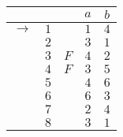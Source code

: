\begin{tabular}{clc|cc}
&&&$a$&$b$\\\hline
$\rightarrow$	&$1$&		&$1$&$4$\\
		&$2$&		&$3$&$1$\\
		&$3$&$F$	&$4$&$2$\\
		&$4$&$F$	&$3$&$5$\\
		&$5$&		&$4$&$6$\\
		&$6$&		&$6$&$3$\\
		&$7$&		&$2$&$4$\\
		&$8$&		&$3$&$1$
\end{tabular}
